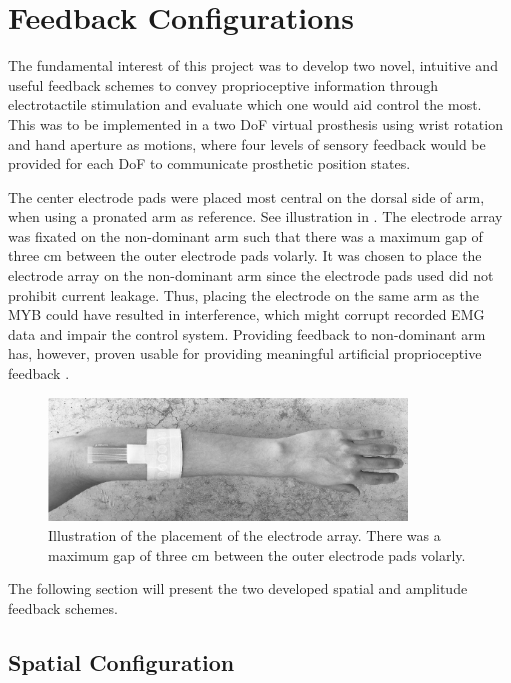 \section{Feedback Configurations} \label{sec:feed}

The fundamental interest of this project was to develop two novel, intuitive and useful feedback schemes to convey proprioceptive information through electrotactile stimulation and evaluate which one would aid control the most. This was to be implemented in a two DoF virtual prosthesis using wrist rotation and hand aperture as motions, where four levels of sensory feedback would be provided for each DoF to communicate prosthetic position states. 

The center electrode pads were placed most central on the dorsal side of arm, when using a pronated arm as reference. See illustration in . The electrode array was fixated on the non-dominant arm such that there was a maximum gap of three cm between the outer electrode pads volarly. It was chosen to place the electrode array on the non-dominant arm since the electrode pads used did not prohibit current leakage. Thus, placing the electrode on the same arm as the MYB could have resulted in interference, which might corrupt recorded EMG data and impair the control system. Providing feedback to non-dominant arm has, however, proven usable for providing meaningful artificial proprioceptive feedback \cite{Pistohl2015}.  

\begin{figure}[H]                 
	\includegraphics[width=0.85\textwidth]{figures/elec_place}  
	\caption{Illustration of the placement of the electrode array. There was a maximum gap of three cm between the outer electrode pads volarly.}
	\label{fig:meth:elec_place} 
\end{figure} The following section will present the two developed spatial and amplitude feedback schemes. 

\subsection{Spatial Configuration}


